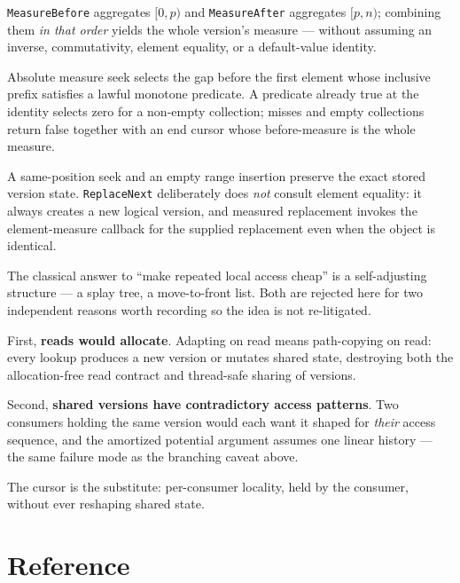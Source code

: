 \documentclass[11pt,twoside,openright]{book}
\newcommand{\code}[1]{\texorpdfstring{\textcolor{d7ink}{\texttt{#1}}}{#1}}
\begin{document}
\begin{contractbox}
\code{MeasureBefore} aggregates $[0, p)$ and \code{MeasureAfter} aggregates
$[p, n)$; combining them \emph{in that order} yields the whole version's measure
--- without assuming an inverse, commutativity, element equality, or a
default-value identity.

Absolute measure seek selects the gap before the first element whose inclusive
prefix satisfies a lawful monotone predicate. A predicate already true at the
identity selects zero for a non-empty collection; misses and empty collections
return false together with an end cursor whose before-measure is the whole
measure.

A same-position seek and an empty range insertion preserve the exact stored
version state. \code{ReplaceNext} deliberately does \emph{not} consult element
equality: it always creates a new logical version, and measured replacement
invokes the element-measure callback for the supplied replacement even when the
object is identical.
\end{contractbox}

\begin{asidebox}
The classical answer to ``make repeated local access cheap'' is a self-adjusting
structure --- a splay tree, a move-to-front list. Both are rejected here for two
independent reasons worth recording so the idea is not re-litigated.

First, \textbf{reads would allocate}. Adapting on read means path-copying on
read: every lookup produces a new version or mutates shared state, destroying
both the allocation-free read contract and thread-safe sharing of versions.

Second, \textbf{shared versions have contradictory access patterns}. Two
consumers holding the same version would each want it shaped for \emph{their}
access sequence, and the amortized potential argument assumes one linear
history --- the same failure mode as the branching caveat above.

The cursor is the substitute: per-consumer locality, held by the consumer,
without ever reshaping shared state.
\end{asidebox}

\appendix
\part{Reference}
\label{part:reference}
\end{document}
